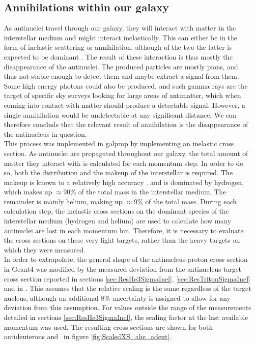\subsection{Annihilations within our galaxy}\label{sec:ResAnnInOurGalaxy}
As antinuclei travel through our galaxy, they will interact with matter in the interstellar medium and might interact inelastically. This can either be in the form of inelastic scattering or annihilation, although of the two the latter is expected to be dominant \cite{}. The result of these interaction is thus mostly the disappearance of the antinuclei. The produced particles are mostly pions, and thus not stable enough to detect them and maybe extract a signal from them. Some high energy photons could also be produced, and such gamma rays are the target of specific sky surveys looking for large areas of antimatter, which when coming into contact with matter should produce a detectable signal. However, a single annihilation would be undetectable at any significant distance. We can therefore conclude that the relevant result of annihilation is the disappearance of the antinucleus in question. \\

This process was implemented in galprop by implementing an inelastic cross section. As antinuclei are propagated throughout our galaxy, the total amount of matter they interact with is calculated for each momentum step. In order to do so, both the distribution and the makeup of the interstellar is required. The makeup is known to a relatively high accuracy \cite{}, and is dominated by hydrogen, which makes up $\approx$90\% of the total mass in the interstellar medium. The remainder is mainly helium, making up $\approx 9\%$ of the total mass. During each calculation step, the inelastic cross sections on the dominant species of the interstellar medium (hydrogen and helium) are used to calculate how many antinuclei are lost in each momentum bin. Therefore, it is necessary to evaluate the cross sections on these very light targets, rather than the heavy targets on which they were measured.\\

In order to extrapolate, the general shape of the antinucleus-proton cross section in Geant4 was modified by the measured deviation from the antinucleus-target cross section reported in sections \ref{sec:ResHe3SigmaInel}, \ref{sec:ResTritonSigmaInel} and in \cite{}. This assumes that the relative scaling is the same regardless of the target nucleus, although an additional 8\% uncertainty is assigned to allow for any deviation from this assumption. For values outside the range of the measurements detailed in sections \ref{sec:ResHe3SigmaInel}, the scaling factor at the last available momentum was used.
The resulting cross sections are shown for both antideuterons and \ahe\ in figure \ref{fig:ScaledXS_ahe_adeut}. 

